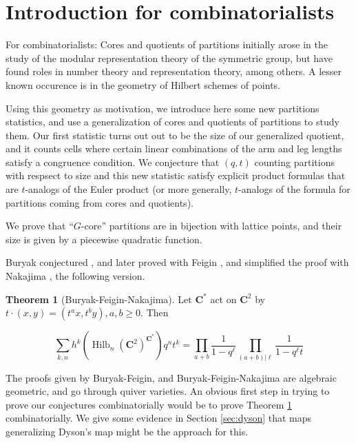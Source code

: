 \documentclass{amsart}[12pt]
\theoremstyle{definition}
\newtheorem{theorem}[dummy]{Theorem}
\newcommand{\C}{\mathbf{C}}
\DeclareMathOperator{\Hilb}{Hilb}
\begin{document}
\section{Introduction for combinatorialists}

For combinatorialists: Cores and quotients of partitions initially arose in the study of the modular representation theory of the symmetric group, but have found roles in number theory and representation theory, among others.  A lesser known occurence is in the geometry of Hilbert schemes of points.  

Using this geometry as motivation, we introduce here some new partitions statistics, and use a generalization of cores and quotients of partitions to study them.  Our first statistic turns out out to be the size of our generalized quotient, and it counts cells where certain linear combinations of the arm and leg lengths satisfy a congruence condition.  We conjecture that $(q,t)$ counting partitions with respsect to size and this new statistic satisfy explicit product formulas that are $t$-analogs of the Euler product (or more generally, $t$-analogs of the formula for partitions coming from cores and quotients).  

We prove that ``$G$-core'' partitions are in bijection with lattice points, and their size is given by a piecewise quadratic function.  




Buryak conjectured \cite{Buryak}, and later proved with Feigin \cite{BF}, and simplified the proof with Nakajima \cite{BFN}, the following version. 

\begin{theorem}[Buryak-Feigin-Nakajima] \label{thm:BFN}
Let $\C^*$ act on $\C^2$ by $t\cdot (x,y)=(t^ax, t^by), a,b\geq 0$.  Then

$$\sum_{k,n} h^k(\Hilb_n(\C^2)^{\C^*})q^nt^k=\prod_{a+b } \frac{1}{1-q^\ell}\prod_{(a+b)|\ell} \frac{1}{1-q^\ell t}$$
\end{theorem}

The proofs given by Buryak-Feigin, and Buryak-Feigin-Nakajima are algebraic geometric, and go through quiver varieties.  An obvious first step in trying to prove our conjectures combinatorially would be to prove Theorem \ref{thm:BFN} combinatorially.  We give some evidence in Section \ref{sec:dyson} that maps generalizing Dyson's map might be the approach for this.
\end{document}
